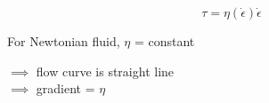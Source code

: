 \documentclass{beamer}
\begin{document}
\begin{frame}
\begin{columns}[t]
\begin{column}{0.45\paperwidth}
      $$ \tau = \eta(\dot{\epsilon}) \dot{\epsilon} $$

      \vspace{0.25cm}

      For Newtonian fluid, $\eta$ = constant \\

      \vspace{0.25cm}

      $\implies$ flow curve is straight line \\

      $\implies$ gradient = $\eta$ \\
      

    \end{column}

  \end{columns}

\end{frame}
\end{document}
